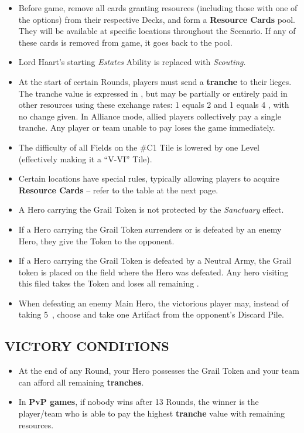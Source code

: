 \begin{multicols*}{2}
\begin{itemize}
  \item Before game, remove all cards granting resources (including those with one of the options) from their respective Decks, and form a \textbf{Resource Cards} pool. They will be available at specific locations throughout the Scenario. If any of these cards is removed from game, it goes back to the pool.
  \item Lord Haart's starting \textit{Estates} Ability is replaced with \textit{Scouting}.
  \item At the start of certain Rounds, players must send a \textbf{tranche} to their lieges. The tranche value is expressed in , but may be partially or entirely paid in other resources using these exchange rates: 1  equals 2  and 1  equals 4 , with no change given. In Alliance mode, allied players collectively pay a single tranche. Any player or team unable to pay loses the game immediately.
  \item The difficulty of all Fields on the \#C1 Tile is lowered by one Level (effectively making it a ``V-VI'' Tile).
  \item Certain locations have special rules, typically allowing players to acquire \textbf{Resource Cards} -- refer to the table at the next page.
  \item A Hero carrying the Grail Token is not protected by the \textit{Sanctuary} effect.
  \item If a Hero carrying the Grail Token surrenders or is defeated by an enemy Hero, they give the Token to the opponent.
  \item If a Hero carrying the Grail Token is defeated by a Neutral Army, the Grail token is placed on the field where the Hero was defeated. Any hero visiting this filed takes the Token and loses all remaining .
  \item When defeating an enemy Main Hero, the victorious player may, instead of taking \mbox{5 }, choose and take one Artifact from the opponent's Discard Pile.
\end{itemize}

\subsection*{\MakeUppercase{Victory Conditions}}

\begin{itemize}
  \item At the end of any Round, your Hero possesses the Grail Token and your team can afford all remaining \textbf{tranches}.
  \item In \textbf{PvP games}, if nobody wins after 13 Rounds, the winner is the player/team who is able to pay the highest \textbf{tranche} value with remaining resources.
\end{itemize}


\end{multicols*}
